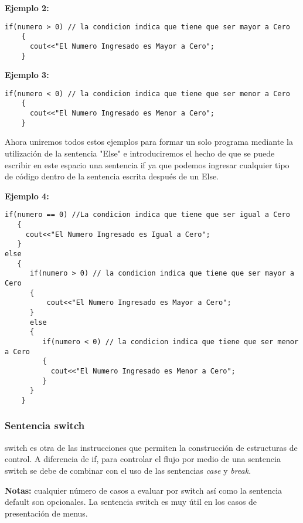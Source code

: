 \textbf{Ejemplo 2:}

\begin{lstlisting}[style=Cpp, label=if-ejemplo-2, caption=If Ejemplo 2]
if(numero > 0) // la condicion indica que tiene que ser mayor a Cero
    {    
      cout<<"El Numero Ingresado es Mayor a Cero";
    }
\end{lstlisting}

\textbf{Ejemplo 3:}

\begin{lstlisting}[style=Cpp, label=if-ejemplo-3, caption=If Ejemplo 3]
if(numero < 0) // la condicion indica que tiene que ser menor a Cero
    {    
      cout<<"El Numero Ingresado es Menor a Cero";
    }
\end{lstlisting}

Ahora uniremos todos estos ejemplos para formar un solo programa mediante la utilización de la sentencia "Else" e introduciremos el hecho de que se puede escribir en este espacio una sentencia if ya que podemos ingresar cualquier tipo de código dentro de la sentencia escrita después de un Else.

\textbf{Ejemplo 4:}

\begin{lstlisting}[style=Cpp, label=if-ejemplo-4, caption=If Ejemplo 4]
if(numero == 0) //La condicion indica que tiene que ser igual a Cero
   {
     cout<<"El Numero Ingresado es Igual a Cero";
   }
else
   {
      if(numero > 0) // la condicion indica que tiene que ser mayor a Cero
      {    
          cout<<"El Numero Ingresado es Mayor a Cero";
      }
      else
      {
         if(numero < 0) // la condicion indica que tiene que ser menor a Cero
         {    
           cout<<"El Numero Ingresado es Menor a Cero";
         }
      }
    }
\end{lstlisting}


\subsubsection{Sentencia switch}

switch es otra de las instrucciones que permiten la construcción de estructuras de control. A diferencia de if, para controlar el flujo por medio de una sentencia switch se debe de combinar con el uso de las sentencias \textit{case} y \textit{break}.

\textbf{Notas:} cualquier número de casos a evaluar por switch así como la sentencia default son opcionales. La sentencia switch es muy útil en los casos de presentación de menus.

